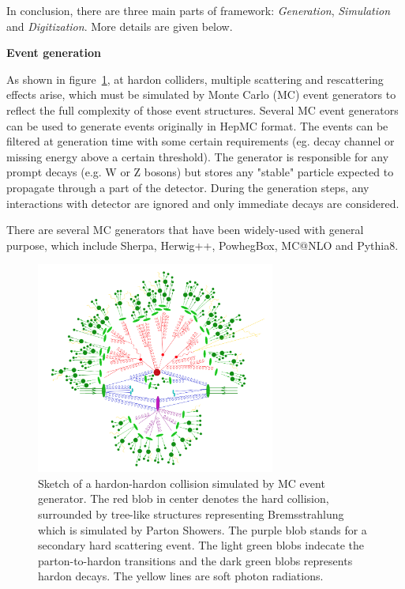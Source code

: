 In conclusion, there are three main parts of framework: \textit{Generation}, \textit{Simulation} and \textit{Digitization}.
More details are given below.

\textbf{Event generation}

As shown in figure~\ref{fig:mc_event_structure}\cite{Hoche:2014rga}, at hardon colliders, multiple scattering and rescattering effects arise, which must be simulated by Monte Carlo (MC) event generators to reflect the full complexity of those event structures.
Several MC event generators can be used to generate events originally in HepMC format.
The events can be filtered at generation time with some certain requirements (eg. decay channel or missing energy above a certain threshold).
The generator is responsible for any prompt decays (e.g. W or Z bosons) but stores any "stable" particle expected to propagate through a part of the detector. 
During the generation steps, any interactions with detector are ignored and only immediate decays are considered.

There are several MC generators that have been widely-used with general purpose, which include Sherpa\cite{Gleisberg_2009}, Herwig++\cite{Bahr2008}, PowhegBox\cite{Nason:2004rx}, MC@NLO\cite{Frixione_2002} and Pythia8\cite{Sjostrand:2007gs}.

\begin{figure}[!htb]
  \centering
  \includegraphics[width=0.7\textwidth]{figures/Simulation/mc_event_structure.png}
  \caption{Sketch of a hardon-hardon collision simulated by MC event generator. The red blob in center denotes the hard collision, surrounded by tree-like structures representing Bremsstrahlung which is simulated by Parton Showers. The purple blob stands for a secondary hard scattering event. The light green blobs indecate the parton-to-hardon transitions and the dark green blobs represents hardon decays. The yellow lines are soft photon radiations.}
  \label{fig:mc_event_structure}
\end{figure}

